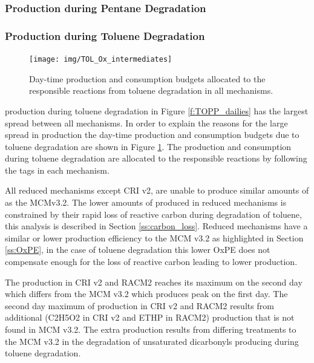 \subsubsection[Ox Production during Pentane Degradation]{ Production during Pentane Degradation} \label{sss:alkanes}

\subsubsection[Ox Production during Toluene Degradation]{ Production during Toluene Degradation} \label{sss:aromatic}

\begin{figure}
    \centering
    \texttt{[image: img/TOL\_Ox\_intermediates]}
    \vspace{0mm}
    \caption{Day-time  production and consumption budgets allocated to the responsible reactions from toluene degradation in all mechanisms.}
    \vspace{-4mm}
    \label{f:toluene_Ox}
\end{figure}

 production during toluene degradation in Figure \ref{f:TOPP_dailies} has the largest spread between all mechanisms.
In order to explain the reasons for the large spread in  production the day-time  production and consumption budgets due to toluene degradation are shown in Figure \ref{f:toluene_Ox}.
The  production and consumption during toluene degradation are allocated to the responsible reactions by following the tags in each mechanism.

All reduced mechanisms except CRI v2, are unable to produce similar amounts of  as the MCMv3.2.
The lower amounts of  produced in reduced mechanisms is constrained by their rapid loss of reactive carbon during degradation of toluene, this analysis is described in Section \ref{ss:carbon_loss}.
Reduced mechanisms have a similar or lower  production efficiency to the MCM v3.2 as highlighted in Section \ref{ss:OxPE}, in the case of toluene degradation this lower OxPE does not compensate enough for the loss of reactive carbon leading to lower  production.

The  production in CRI v2 and RACM2 reaches its maximum on the second day which differs from the MCM v3.2 which produces peak  on the first day.
The second day maximum of  production in CRI v2 and RACM2 results from additional  (C2H5O2 in CRI v2 and ETHP in RACM2) production that is not found in MCM v3.2.
The extra  production results from differing treatments to the MCM v3.2 in the degradation of unsaturated dicarbonyls producing during toluene degradation.

